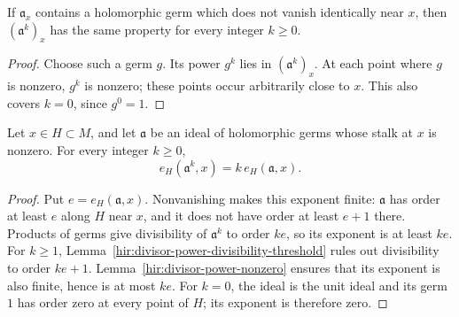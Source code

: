 \begin{lemma}
\label{hir:divisor-power-nonzero}
\leanok
If $\mathfrak a_x$ contains a holomorphic germ which does not vanish
identically near $x$, then $(\mathfrak a^k)_x$ has the same property for
every integer $k\geq0$.
\end{lemma}
\begin{proof}
Choose such a germ $g$.  Its power $g^k$ lies in $(\mathfrak a^k)_x$.
At each point where $g$ is nonzero, $g^k$ is nonzero; these points occur
arbitrarily close to $x$.  This also covers $k=0$, since $g^0=1$.
\end{proof}

\begin{theorem}
\label{hir:divisor-exponent-ideal-power}
\leanok
Let $x\in H\subset M$, and let $\mathfrak a$ be an ideal of holomorphic
germs whose stalk at $x$ is nonzero.  For every integer $k\geq0$,
\[
 e_H(\mathfrak a^k,x)=k\,e_H(\mathfrak a,x).
\]
\end{theorem}
\begin{proof}
Put $e=e_H(\mathfrak a,x)$.  Nonvanishing makes this exponent finite:
$\mathfrak a$ has order at least $e$ along $H$ near $x$, and it does not
have order at least $e+1$ there.  Products of germs give divisibility of
$\mathfrak a^k$ to order $ke$, so its exponent is at least $ke$.
For $k\geq1$, Lemma~\ref{hir:divisor-power-divisibility-threshold}
rules out divisibility to order $ke+1$.  Lemma~\ref{hir:divisor-power-nonzero}
ensures that its exponent is also finite, hence is at most $ke$.
For $k=0$, the ideal is the unit ideal and its germ $1$ has order zero
at every point of $H$; its exponent is therefore zero.
\end{proof}

